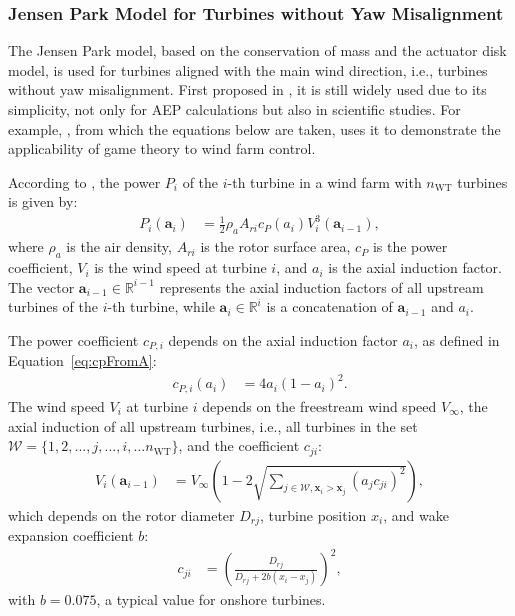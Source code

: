 \subsubsection{Jensen Park Model for Turbines without Yaw Misalignment} \label{subsecJensen}
The Jensen Park model, based on the conservation of mass and the actuator disk model, is used for turbines aligned with the main wind direction, i.e., turbines without yaw misalignment. First proposed in \cite{jensen1983note}, it is still widely used due to its simplicity, not only for AEP calculations but also in scientific studies. For example, \cite{barreiro2019data}, from which the equations below are taken, uses it to demonstrate the applicability of game theory to wind farm control. 

According to \cite{jensen1983note}, the power $P_i$ of the $i$-th turbine in a wind farm with $n_{\text{WT}}$ turbines is given by:
\begin{align}\label{eqPAIC}
    P_{i} (\bm{a}_i) &= \frac{1}{2} \rho_a A_{ri} c_{P}(a_{i}) V_{i}^3(\bm{a}_{i-1}),
\end{align}
where $\rho_a$ is the air density, $A_{ri}$ is the rotor surface area, $c_P$ is the power coefficient, $V_{i}$ is the wind speed at turbine $i$, and $a_i$ is the axial induction factor. The vector $\bm{a}_{i-1} \in {\mathbb{R}}^{i-1}$ represents the axial induction factors of all upstream turbines of the $i$-th turbine, while $\bm{a}_{i} \in {\mathbb{R}}^{i}$ is a concatenation of $\bm{a}_{i-1}$ and $a_i$.

The power coefficient $c_{P,i}$ depends on the axial induction factor $a_i$, as defined in Equation~\eqref{eq:cpFromA}:
\begin{align} \label{eqcP_from_a}
    c_{P,i}(a_i) &= 4a_i(1-a_i)^2.
\end{align}
%
The wind speed $V_{i}$ at turbine $i$ depends on the freestream wind speed $V_\infty$, the axial induction of all upstream turbines, i.e., all turbines in the set $\mathcal{W} = \{1,2,...,j,...,i,... n_{\text{WT}}\}$, and the coefficient $c_{ji}$:
\begin{align} \label{eqVri}
    V_{i}(\bm{a}_{i-1}) &= V_\infty \left( 1 - 2\sqrt{\sum \limits_{j\in \mathcal{W}, \bm{x}_i>\bm{x}_{j}} (a_{j} c_{ji})^2} \right),
\end{align}
which depends on the rotor diameter $D_{rj}$, turbine position $x_i$, and wake expansion coefficient $b$:
\begin{align*}
    c_{ji} &= \left(\frac{D_{rj}}{D_{rj} + 2b (x_i - x_{j})}\right)^2,
\end{align*} with $b = 0.075$, a typical value for onshore turbines. 

